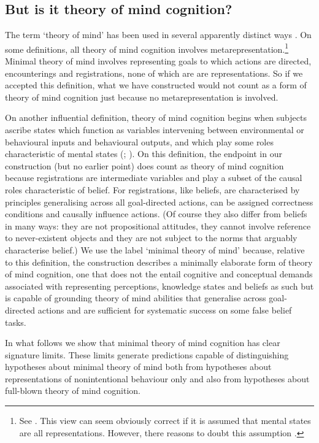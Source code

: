 \documentclass[12pt,\papersize]{extarticle}
\begin{document}
\subsection{But is it theory of mind cognition?}
The term ‘theory of mind’ has been used in several apparently distinct ways \citep[]{en_1415}.  
On some definitions, all theory of mind cognition involves metarepresentation.\footnote{
See \citet{en_81}.  This view can seem obviously correct if it is assumed that  mental states are all representations.
However, there reasons to doubt this assumption \citep[see, for instance, ][]{Campbell:2002ge}.
}  
Minimal theory of mind involves representing goals to which actions are directed, encounterings and registrations, none of which are are representations. 
So if we accepted this definition, what we have constructed would not count as a form of theory of mind cognition just because no metarepresentation is involved.

On another influential definition, theory of mind cognition begins when subjects ascribe states which function as variables intervening between environmental or behavioural inputs and behavioural outputs, and which play some roles characteristic of mental states (\citealp{en_1416}; \citealp[][p.\ 732]{Penn:2007ey}).  
On this definition, the endpoint in our construction (but no earlier point) does count as theory of mind cognition because registrations are intermediate variables and play a subset of the causal roles characteristic of belief.  
For registrations, like beliefs, are characterised by principles generalising across all goal-directed actions,
can be assigned correctness conditions
and causally influence actions.
(Of course they also differ from beliefs in many ways:
they are not propositional attitudes,  they cannot involve reference to never-existent objects and they are not subject to the norms that arguably characterise belief.)
We use the label ‘minimal theory of mind’ because, relative to this definition, the construction describes a minimally elaborate form of theory of mind cognition,
one that does not the entail cognitive and conceptual demands associated with representing perceptions, knowledge states and beliefs as such  
but is capable of grounding theory of mind abilities that generalise across goal-directed actions and are sufficient for systematic success on some false belief tasks.

In what follows we show that minimal theory of mind cognition has clear signature limits.  These limits generate predictions capable of distinguishing hypotheses about minimal theory of mind both 
	from hypotheses  about  representations of nonintentional behaviour only 
	and also 
	from  hypotheses about full-blown theory of mind cognition. 
\end{document}

